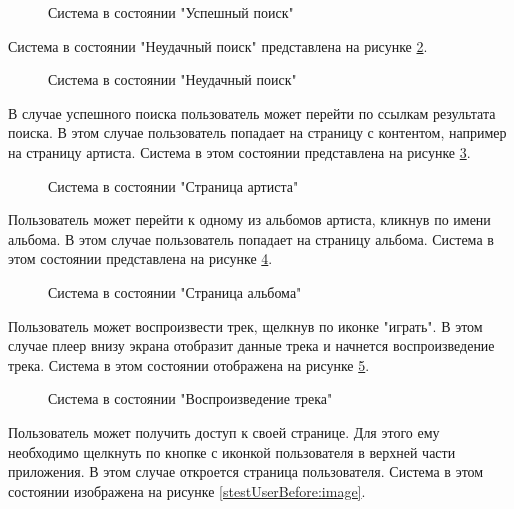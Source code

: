 \begin{figure}[!htb]
	\caption{Система в состоянии "Успешный поиск"}
	\label{stestSearchSuc:image}
\end{figure}

Система в состоянии "Неудачный поиск" представлена на рисунке \ref{stestSearchFail:image}.

\begin{figure}[!htb]
	\caption{Система в состоянии "Неудачный поиск"}
	\label{stestSearchFail:image}
\end{figure}

В случае успешного поиска пользователь может перейти по ссылкам результата поиска. В этом случае пользователь попадает на страницу с контентом, например на страницу артиста. Система в этом состоянии представлена на рисунке \ref{stestArtist:image}.

\begin{figure}[!htb]
	\caption{Система в состоянии "Страница артиста"}
	\label{stestArtist:image}
\end{figure}

Пользователь может перейти к одному из альбомов артиста, кликнув по имени альбома. В этом случае пользователь попадает на страницу альбома. Система в этом состоянии представлена на рисунке \ref{stestAlbum:image}.

\begin{figure}[!htb]
	\caption{Система в состоянии "Страница альбома"}
	\label{stestAlbum:image}
\end{figure}

Пользователь может воспроизвести трек, щелкнув по иконке "играть". В этом случае плеер внизу экрана отобразит данные трека и начнется воспроизведение трека. Система в этом состоянии отображена на рисунке \ref{stestPlayer:image}.

\begin{figure}[!htb]
	\caption{Система в состоянии "Воспроизведение  трека"}
	\label{stestPlayer:image}
\end{figure}

Пользователь может получить доступ к своей странице. Для этого ему необходимо щелкнуть по кнопке с иконкой пользователя в верхней части приложения. В этом случае откроется страница пользователя. Система в этом состоянии изображена на рисунке \ref{stestUserBefore:image}.

